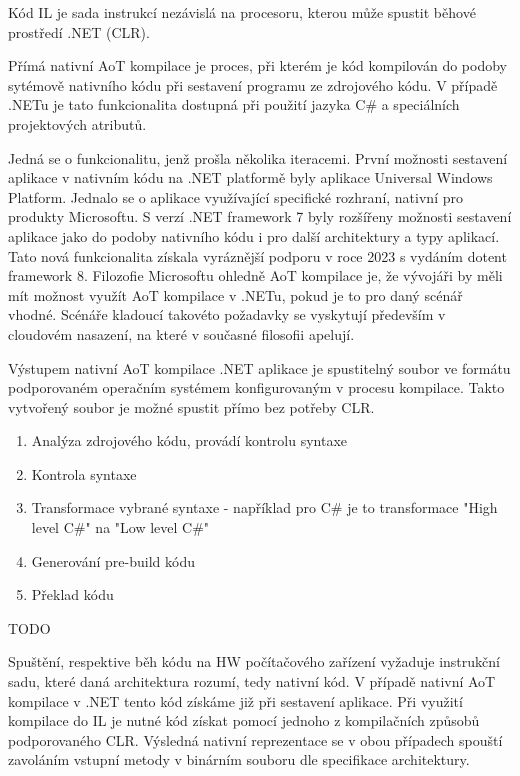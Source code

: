 Kód IL je sada instrukcí nezávislá na procesoru, kterou může spustit běhové prostředí .NET (CLR).


Přímá nativní AoT kompilace je proces, při kterém je kód kompilován do podoby sytémově nativního kódu při sestavení programu ze zdrojového kódu. V případě .NETu je tato funkcionalita dostupná při použití jazyka C\# a speciálních projektových atributů. 

Jedná se o funkcionalitu, jenž prošla několika iteracemi. První možnosti sestavení aplikace v nativním kódu na .NET platformě byly aplikace Universal Windows Platform. Jednalo se o aplikace využívající specifické rozhraní, nativní pro produkty Microsoftu. S verzí .NET framework 7 byly rozšířeny možnosti sestavení aplikace jako do podoby nativního kódu i pro další architektury a typy aplikací. Tato nová funkcionalita získala vyráznější podporu v roce 2023 s vydáním dotent framework 8. Filozofie Microsoftu ohledně AoT kompilace je, že vývojáři by měli mít možnost využít AoT kompilace v .NETu, pokud je to pro daný scénář vhodné. Scénáře kladoucí takovéto požadavky se vyskytují především v cloudovém nasazení, na které v současné filosofii apelují. 


Výstupem nativní AoT kompilace .NET aplikace je spustitelný soubor ve formátu podporovaném operačním systémem konfigurovaným v procesu kompilace. Takto vytvořený soubor je možné spustit přímo bez potřeby CLR. 


\begin{enumerate}
    \item Analýza zdrojového kódu, provádí kontrolu syntaxe
    \item Kontrola syntaxe
    \item Transformace vybrané syntaxe - například pro C\# je to transformace "High level C\#" na "Low level C\#"
    \item Generování pre-build kódu 
    \item Překlad kódu
\end{enumerate}


TODO


Spuštění, respektive běh kódu na HW počítačového zařízení vyžaduje instrukční sadu, které daná architektura rozumí, tedy nativní kód. V případě nativní AoT kompilace v .NET tento kód získáme již při sestavení aplikace. Při využití kompilace do IL je nutné kód získat pomocí jednoho z kompilačních způsobů podporovaného CLR. Výsledná nativní reprezentace se v obou případech spouští zavoláním vstupní metody v binárním souboru dle specifikace architektury.

